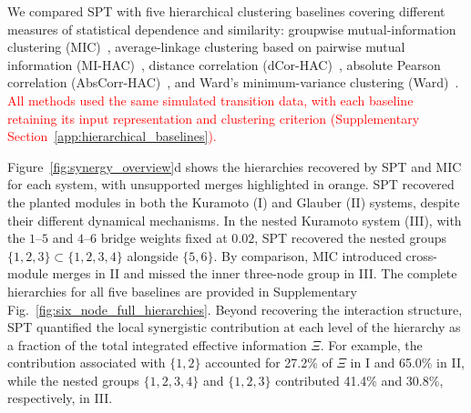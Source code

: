\documentclass[fleqn,10pt]{wlscirep}
\newcommand{\rev}[1]{\textcolor{red}{#1}}
\theoremstyle{naturetheorem}
\begin{document}
We compared SPT with five hierarchical clustering baselines covering different measures of statistical dependence and similarity: groupwise mutual-information clustering (MIC)~\cite{Kraskov2005HierarchicalMI}, average-linkage clustering based on pairwise mutual information (MI-HAC)~\cite{Kraskov2004EstimatingMI,Mullner2011Hierarchical}, distance correlation (dCor-HAC)~\cite{Szekely2007DistanceCorrelation}, absolute Pearson correlation (AbsCorr-HAC)~\cite{deHoon2004OpenSourceClustering}, and Ward's minimum-variance clustering (Ward)~\cite{Ward1963HierarchicalGrouping}.
\rev{All methods used the same simulated transition data, with each baseline retaining its input representation and clustering criterion (Supplementary Section~\ref{app:hierarchical_baselines}).}

Figure~\ref{fig:synergy_overview}d shows the hierarchies recovered by SPT and MIC for each system, with unsupported merges highlighted in orange. SPT recovered the planted modules in both the Kuramoto (I) and Glauber (II) systems, despite their different dynamical mechanisms. In the nested Kuramoto system (III), with the $1$--$5$ and $4$--$6$ bridge weights fixed at $0.02$, SPT recovered the nested groups $\{1,2,3\}\subset\{1,2,3,4\}$ alongside $\{5,6\}$. By comparison, MIC introduced cross-module merges in II and missed the inner three-node group in III. The complete hierarchies for all five baselines are provided in Supplementary Fig.~\ref{fig:six_node_full_hierarchies}. Beyond recovering the interaction structure, SPT quantified the local synergistic contribution at each level of the hierarchy as a fraction of the total integrated effective information $\Xi$. For example, the contribution associated with $\{1,2\}$ accounted for 27.2\% of $\Xi$ in I and 65.0\% in II, while the nested groups $\{1,2,3,4\}$ and $\{1,2,3\}$ contributed 41.4\% and 30.8\%, respectively, in III.
\end{document}
